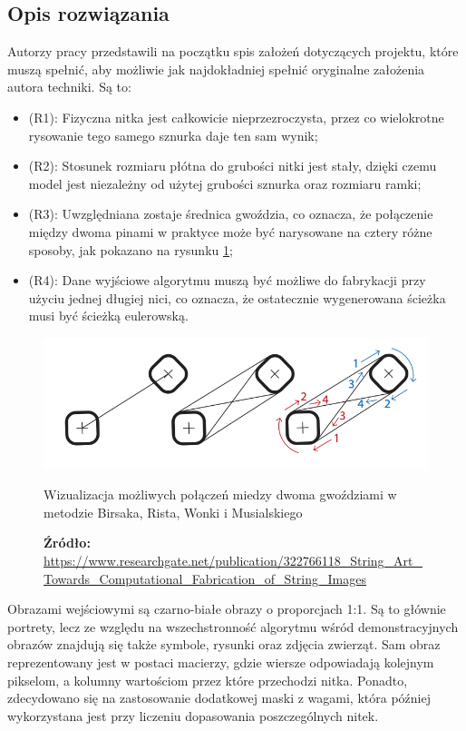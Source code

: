         \subsection{Opis rozwiązania}
        Autorzy pracy przedstawili na początku spis założeń dotyczących projektu, które muszą spełnić, aby możliwie jak najdokładniej spełnić oryginalne założenia autora techniki. Są to:
        \begin{itemize}
            \item (R1): Fizyczna nitka jest całkowicie nieprzezroczysta, przez co wielokrotne rysowanie tego samego sznurka daje ten sam wynik;
            \item (R2): Stosunek rozmiaru płótna do grubości nitki jest stały, dzięki czemu model jest niezależny od użytej grubości sznurka oraz rozmiaru ramki;
            \item (R3): Uwzględniana zostaje średnica gwoździa, co oznacza, że połączenie między dwoma pinami w praktyce może być narysowane na cztery różne sposoby, jak pokazano na rysunku \ref{birsak-edges};
            \item (R4): Dane wyjściowe algorytmu muszą być możliwe do fabrykacji przy użyciu jednej długiej nici, co oznacza, że ostatecznie wygenerowana ścieżka musi być ścieżką eulerowską. 
        \end{itemize}
        \begin{figure}[H]
            \centering
            \includegraphics[width=\textwidth,keepaspectratio]{img/3-others/birsak-edges.png}
            \caption{Wizualizacja możliwych połączeń miedzy dwoma gwoździami w metodzie Birsaka, Rista, Wonki i Musialskiego}
            \caption*{\footnotesize{\textbf{Źródło:} {\url{https://www.researchgate.net/publication/322766118_String_Art_Towards_Computational_Fabrication_of_String_Images}}}}
            \label{birsak-edges}
        \end{figure}
    
        Obrazami wejściowymi są czarno-białe obrazy o proporcjach 1:1. Są to głównie portrety, lecz ze względu na wszechstronność algorytmu wśród demonstracyjnych obrazów znajdują się także symbole, rysunki oraz zdjęcia zwierząt. Sam obraz reprezentowany jest w postaci macierzy, gdzie wiersze odpowiadają kolejnym pikselom, a kolumny wartościom przez które przechodzi nitka. Ponadto, zdecydowano się na zastosowanie dodatkowej maski z wagami, która później wykorzystana jest przy liczeniu dopasowania poszczególnych nitek.
        
